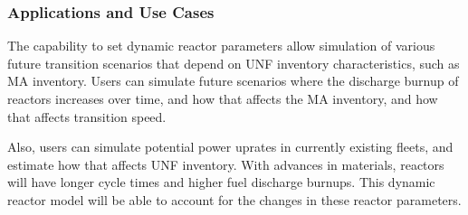 \subsubsection{Applications and Use Cases}

The capability to set dynamic reactor parameters
allow simulation of various future transition scenarios
that depend on \gls{UNF} inventory characteristics,
such as \gls{MA} inventory. 
Users can simulate future scenarios where the discharge
burnup of reactors increases over time, and how that
affects the \gls{MA} inventory, and how that affects
transition speed. 

Also, users can simulate potential
power uprates in currently existing fleets, and
estimate how that affects \gls{UNF} inventory. With
advances in materials, reactors will have longer
cycle times and higher fuel discharge burnups.
This dynamic reactor model will be able to account
for the changes in these reactor parameters.

\FloatBarrier